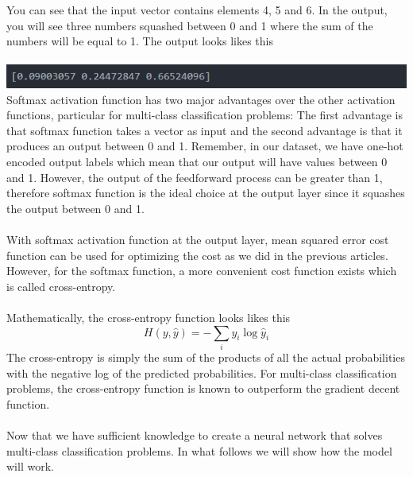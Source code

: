 \documentclass[11pt]{article}
\theoremstyle{definition}
\begin{document}
You can see that the input vector contains elements 4, 5 and 6. In the output, you will see three numbers squashed between 0 and 1 where the sum of the numbers will be equal to 1. The output looks likes this\\\\
\includegraphics[scale=1]{image2.PNG}\\
Softmax activation function has two major advantages over the other activation functions, particular for multi-class classification problems: The first advantage is that softmax function takes a vector as input and the second advantage is that it produces an output between 0 and 1. Remember, in our dataset, we have one-hot encoded output labels which mean that our output will have values between 0 and 1. However, the output of the feedforward process can be greater than 1, therefore softmax function is the ideal choice at the output layer since it squashes the output between 0 and 1.\\\\
With softmax activation function at the output layer, mean squared error cost function can be used for optimizing the cost as we did in the previous articles. However, for the softmax function, a more convenient cost function exists which is called cross-entropy.\\\\
Mathematically, the cross-entropy function looks likes this
$$
H(y,\hat{y})=-\sum_iy_i\log\hat{y}_i
$$
The cross-entropy is simply the sum of the products of all the actual probabilities with the negative log of the predicted probabilities. For multi-class classification problems, the cross-entropy function is known to outperform the gradient decent function.\\\\
Now that we have sufficient knowledge to create a neural network that solves multi-class classification problems. In what follows we will show how the model will work.\\\\
\end{document}
